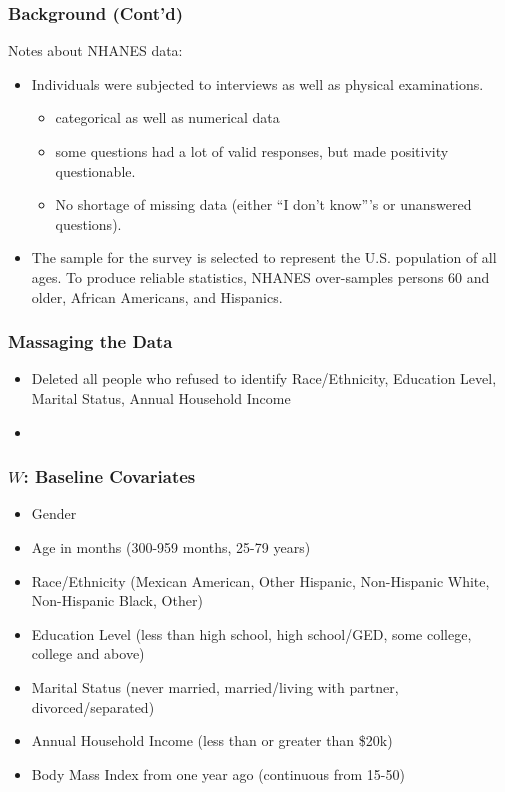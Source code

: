 \documentclass{beamer}
\begin{document}
\begin{frame}
  \frametitle{Background (Cont'd)}
  Notes about NHANES data:
  \begin{itemize}
 \item Individuals were subjected to interviews as well as physical examinations.
  \begin{itemize}
    \item categorical as well as numerical data
    \item some questions had a lot of valid responses, but made positivity questionable.
    \item No shortage of missing data (either ``I don't know'''s or unanswered questions).
  \end{itemize}
 \item The sample for the survey is selected to represent the U.S. population of all ages. To produce reliable statistics, NHANES over-samples persons 60 and older, African Americans, and Hispanics.
 \end{itemize}
\end{frame}

\begin{frame}
\frametitle{Massaging the Data}
  \begin{itemize}
    \vfill \item Deleted all people who refused to identify Race/Ethnicity, Education Level, Marital Status, Annual Household Income
    \vfill \item
  \end{itemize}
\end{frame}

\begin{frame}
\frametitle{$W$: Baseline Covariates}
   \begin{itemize}
   \item Gender
   \item Age in months (300-959 months, 25-79 years)
   \item Race/Ethnicity (Mexican American, Other Hispanic, Non-Hispanic White, Non-Hispanic Black, Other)
   \item Education Level (less than high school, high school/GED, some college, college and above)
   \item Marital Status (never married, married/living with partner, divorced/separated)
   \item Annual Household Income (less than or greater than \$20k)
   \item Body Mass Index from one year ago (continuous from 15-50)
  \end{itemize}
\end{frame}
\end{document}
